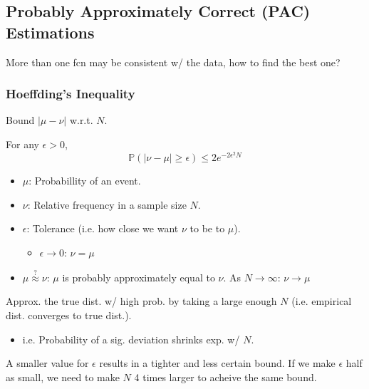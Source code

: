 \subsection{Probably Approximately Correct (PAC) Estimations}
\begin{motivation}
    More than one fcn may be consistent w/ the data, how to find the best one?
\end{motivation}

\subsubsection{Hoeffding's Inequality}
\begin{motivation}
    Bound $|\mu - \nu|$ w.r.t. $N$.
\end{motivation}

\begin{definition}
    For any $\epsilon > 0$,
    \begin{equation}
        \mathbb{P}(|\nu - \mu| \geq \epsilon) \leq 2e^{-2\epsilon^2N}
    \end{equation}
    \begin{itemize}
        \item $\mu$: Probabillity of an event.
        \item $\nu$: Relative frequency in a sample size $N$.
        \item $\epsilon$: Tolerance (i.e. how close we want $\nu$ to be to $\mu$).
        \begin{itemize}
            \item $\epsilon \rightarrow 0$: $\nu = \mu$
        \end{itemize}
        \item $\mu \overset{?}{\approx} \nu $: $\mu$ is probably approximately equal to $\nu$. As $N \rightarrow \infty$: $\nu \rightarrow \mu$
    \end{itemize}
\end{definition}

\begin{warning}
    Approx. the true dist. w/ high prob. by taking a large enough $N$ (i.e. empirical dist. converges to true dist.).
    \begin{itemize}
        \item i.e. Probability of a sig. deviation shrinks exp. w/ $N$.
    \end{itemize}
\end{warning}

\begin{notes}
    A smaller value for $\epsilon$ results in a tighter and less certain bound. If we make $\epsilon$ half as small, we need to make $N$ 4 times larger to acheive the same bound.
\end{notes}

